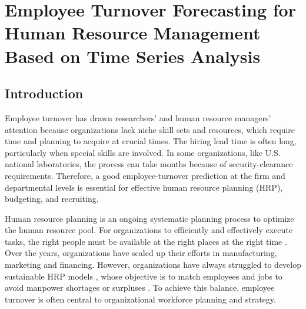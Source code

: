 \chapter{Employee Turnover Forecasting for Human Resource Management Based on Time Series Analysis}\label{ch:timesereis}
\section{Introduction}
Employee turnover has drawn researchers' and human resource managers' attention because organizations lack  niche skill sets and resources, which require time and planning to acquire at crucial times. The hiring lead time is often long, particularly when special skills are involved. In some organizations, like U.S. national laboratories, the process can take months because of security-clearance requirements. Therefore, a good employee-turnover prediction at the firm and departmental levels is essential for effective human resource planning (HRP), budgeting, and recruiting. 

Human resource planning is an ongoing systematic planning process to optimize the human resource pool. For organizations to efficiently and effectively execute tasks, the right people must be available at the right places at the right time \citep{khoong1996}. Over the years, organizations have scaled up their efforts in manufacturing, marketing and financing. However, organizations have always struggled to develop sustainable HRP models  \citep{heneman1993}, whose objective is to match employees and jobs to avoid manpower shortages or surpluses \citep{cambal2011}. To achieve this balance, employee turnover is often central to organizational workforce planning and strategy.

